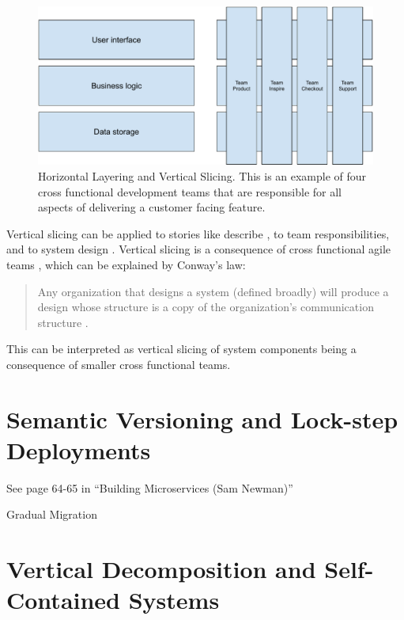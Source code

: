 \begin{figure}
    \centering
    \includegraphics[width=\linewidth]{images/vertical-slicing.pdf}
    \caption{Horizontal Layering and Vertical Slicing. This is an example of four cross functional development teams that are responsible for all aspects of delivering a customer facing feature.}
    \label{fig:vertical-slicing}
\end{figure}

Vertical slicing can be applied to stories like \citeauthor{Ratner2011} describe \cite{Ratner2011}, to team responsibilities, and to system design \cite{Geers2020}. Vertical slicing is a consequence of cross functional agile teams \cite{Geers2020}, which can be explained by Conway's law: \blockquote{Any organization that designs a system (defined broadly) will produce a design whose structure is a copy of the organization's communication structure \cite{Conway}.} This can be interpreted as vertical slicing of system components being a consequence of smaller cross functional teams.

\section{Semantic Versioning and Lock-step Deployments}

See page 64-65 in ``Building Microservices (Sam Newman)''

Gradual Migration

\section{Vertical Decomposition and Self-Contained Systems}
